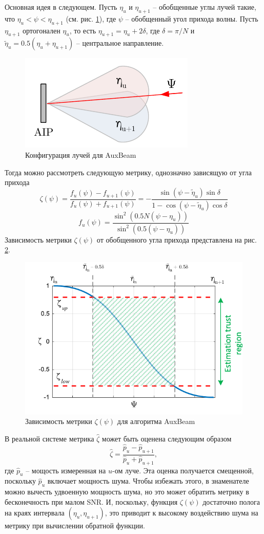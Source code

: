 Основная идея в следующем. Пусть $\eta_u$ и $\eta_{u+1}$ -- обобщенные углы
лучей такие, что $\eta_u<\psi<\eta_{u+1}$ (см. рис. \ref{fig:4.14}), где $\psi$
-- обобщенный угол прихода волны.  Пусть $\eta_{u+1}$ ортогонален $\eta_u$, то
есть $\eta_{u+1} = \eta_u + 2\delta$, где $\delta = \pi/N$  и $\tilde \eta_u =
0.5 (\eta_u + \eta_{u+1})$ -- центральное направление.
\begin{figure}[ht]
    \centering
    \includegraphics[width=0.5\linewidth]{figs/fig4.14}
    \caption{Конфигурация лучей для AuxBeam}
    \label{fig:4.14}
\end{figure}
Тогда можно рассмотреть следующую метрику, однозначно зависящую от угла прихода
\begin{equation}
    \label{eq:4.37}
    \zeta(\psi) = \frac{f_u(\psi) - f_{u+1}(\psi)}{f_u(\psi) + f_{u+1}(\psi)} = - \frac{\sin(\psi - \tilde \eta_u) \sin \delta}{1 - \cos(\psi - \tilde \eta_u) \cos \delta}
\end{equation}
\begin{equation}
    \label{eq:4.38}
    f_u(\psi) = \frac{\sin^2 (0.5 N (\psi - \eta_u))}{\sin^2(0.5 (\psi - \eta_u))}
\end{equation}
Зависимость метрики $\zeta(\psi)$  от обобщенного угла прихода представлена на
рис. \ref{fig:4.15}.
\begin{figure}[ht]
    \centering
    \includegraphics[width=0.5\linewidth]{figs/fig4.15}
    \caption{Зависимость метрики $\zeta(\psi)$ для алгоритма AuxBeam}
    \label{fig:4.15}
\end{figure}
В реальной системе метрика $\hat \zeta$ может быть оценена следующим образом
\begin{equation}
    \label{eq:4.39}
    \hat \zeta = \frac{\hat p_u - \hat p_{u+1}}{ \hat p_u + \hat p_{u+1} },
\end{equation}
где $\hat p_u$ -- мощость измеренная на $u$-ом луче. Эта оценка получается смещенной, поскольку $\hat p_u$ включает мощность шума.
Чтобы избежать этого, в знаменателе можно вычесть удвоенную мощность шума, но это может обратить метрику в бесконечность при малом SNR.
И, поскольку, функция $\zeta(\psi)$ достаточно полога на краях интервала $(\eta_u, \eta_{u+1})$, это приводит к высокому
воздействию шума на метрику при вычислении обратной функции.

